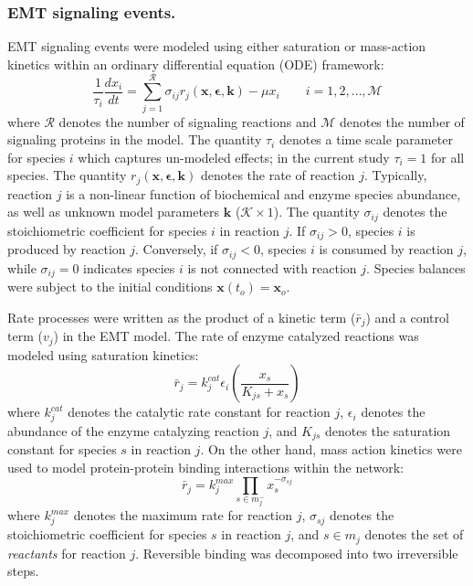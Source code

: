 \documentclass[11pt,letterpaper]{article}
\begin{document}
\subsubsection*{EMT signaling events.}
EMT signaling events were modeled using either saturation or mass-action kinetics within an ordinary differential equation (ODE) framework:
\begin{equation}
  \frac{1}{\tau_{i}}\frac{dx_{i}}{dt}  =  \sum_{j = 1}^{\mathcal{R}}\sigma_{ij}r_{j}\left(\mathbf{x},\mathbf{\epsilon},\mathbf{k}\right)-\mu x_{i}\qquad{i=1,2,\hdots,\mathcal{M}}
\end{equation}
where $\mathcal{R}$ denotes the number of signaling reactions and $\mathcal{M}$ denotes the number of signaling proteins in the model.
The quantity $\tau_{i}$ denotes a time scale parameter for species $i$ which captures un-modeled effects; in the current study $\tau_{i} = 1$ for all species.
The quantity $r_{j}\left(\mathbf{x},\mathbf{\epsilon},\mathbf{k}\right)$ denotes the rate of reaction $j$.
Typically, reaction $j$ is a non-linear function of biochemical and enzyme species abundance, as well as unknown model parameters $\mathbf{k}$ ($\mathcal{K}\times{1}$).
The quantity $\sigma_{ij}$ denotes the stoichiometric coefficient for species $i$ in reaction $j$.
If $\sigma_{ij}>0$, species $i$ is produced by reaction $j$.
Conversely, if $\sigma_{ij}<0$, species $i$ is consumed by reaction $j$, while $\sigma_{ij} = 0$ indicates species $i$ is not connected with reaction $j$.
Species balances were subject to the initial conditions $\mathbf{x}\left(t_{o}\right) = \mathbf{x}_{o}$.

Rate processes were written as the product of a kinetic term ($\bar{r}_{j}$) and a control term ($v_{j}$) in the EMT model.
The rate of enzyme catalyzed reactions was modeled using saturation kinetics:
\begin{equation}\label{eqn:rate-saturation}
  \bar{r}_{j} = k_{j}^{cat}\epsilon_{i}\left(\frac{x_{s}}{K_{js} + x_{s}}\right)
\end{equation}
where $k_{j}^{cat}$ denotes the catalytic rate constant for reaction $j$, $\epsilon_{i}$ denotes the abundance of the enzyme catalyzing reaction $j$,
and $K_{js}$ denotes the saturation constant for species $s$ in reaction $j$.
On the other hand, mass action kinetics were used to model protein-protein binding interactions within the network:
\begin{equation}\label{eqn:rate-action}
  \bar{r}_{j} = k_{j}^{max}\prod_{s\in{m_{j}^{-}}}x_{s}^{-\sigma_{sj}}
\end{equation}
where $k_{j}^{max}$ denotes the maximum rate for reaction $j$, $\sigma_{sj}$ denotes the stoichiometric coefficient for species $s$ in reaction $j$,
and $s\in{m_{j}}$ denotes the set of \textit{reactants} for reaction $j$. Reversible binding was decomposed into two irreversible steps.
\end{document}
